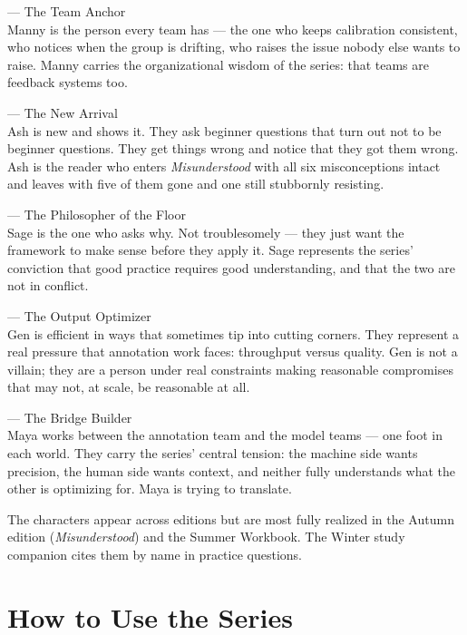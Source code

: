 \documentclass[12pt, a4paper]{article}
\newcommand{\character}[3]{%
  \noindent
  \begin{tcolorbox}[amberstyle, left=8pt, right=8pt, top=5pt, bottom=5pt]
    \noindent{\small\bfseries\sffamily\color{amberdeep} #1}\enspace
    {\footnotesize\color{midgrey}\sffamily — #2}\\[3pt]
    {\small #3}
  \end{tcolorbox}%
  \vspace{4pt}%
}
\begin{document}
\character{Manny}{The Team Anchor}%
{Manny is the person every team has — the one who keeps calibration consistent, who notices when the group is drifting, who raises the issue nobody else wants to raise. Manny carries the organizational wisdom of the series: that teams are feedback systems too.}

\character{Ash}{The New Arrival}%
{Ash is new and shows it. They ask beginner questions that turn out not to be beginner questions. They get things wrong and notice that they got them wrong. Ash is the reader who enters \textit{Misunderstood} with all six misconceptions intact and leaves with five of them gone and one still stubbornly resisting.}

\character{Sage}{The Philosopher of the Floor}%
{Sage is the one who asks why. Not troublesomely — they just want the framework to make sense before they apply it. Sage represents the series' conviction that good practice requires good understanding, and that the two are not in conflict.}

\character{Gen}{The Output Optimizer}%
{Gen is efficient in ways that sometimes tip into cutting corners. They represent a real pressure that annotation work faces: throughput versus quality. Gen is not a villain; they are a person under real constraints making reasonable compromises that may not, at scale, be reasonable at all.}

\character{Maya}{The Bridge Builder}%
{Maya works between the annotation team and the model teams — one foot in each world. They carry the series' central tension: the machine side wants precision, the human side wants context, and neither fully understands what the other is optimizing for. Maya is trying to translate.}

\vspace{8pt}

\begin{tcolorbox}[amberstyle]
The characters appear across editions but are most fully realized in the Autumn edition (\textit{Misunderstood}) and the Summer Workbook. The Winter study companion cites them by name in practice questions.
\end{tcolorbox}

\newpage

\section{How to Use the Series}
\end{document}
